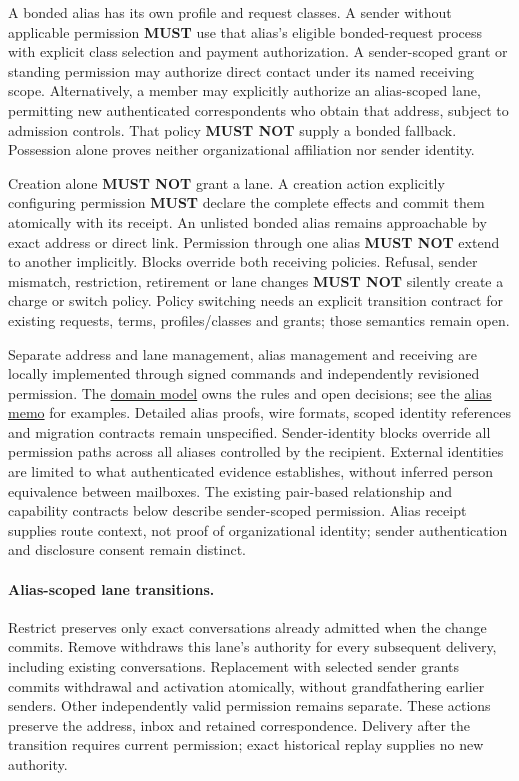 \documentclass[11pt]{article}
\newcommand{\MUST}{\textbf{MUST}}
\newcommand{\MUSTNOT}{\textbf{MUST NOT}}
\begin{document}
A bonded alias has its own profile and request classes. A sender without applicable
permission \MUST{} use that alias's eligible bonded-request process with explicit
class selection and payment authorization. A sender-scoped grant or standing
permission may authorize direct contact under its named receiving scope.
Alternatively, a member may explicitly authorize an alias-scoped lane, permitting
new authenticated correspondents who obtain that address, subject to admission
controls. That policy \MUSTNOT{} supply a bonded fallback. Possession alone proves
neither organizational affiliation nor sender identity.

Creation alone \MUSTNOT{} grant a lane. A creation action explicitly configuring
permission \MUST{} declare the complete effects and commit them atomically with
its receipt. An unlisted bonded alias remains approachable by exact address or
direct link. Permission through one alias \MUSTNOT{} extend to another implicitly.
Blocks override both receiving policies. Refusal, sender mismatch, restriction,
retirement or lane changes \MUSTNOT{} silently create a charge or switch policy.
Policy switching needs an explicit transition contract for existing requests,
terms, profiles/classes and grants; those semantics remain open.

Separate address and lane management, alias management and receiving are locally
implemented through signed commands and independently revisioned permission. The
\href{DOMAIN_MODEL.md}{domain model} owns the rules and open decisions; see the
\href{cs_mail_aliases_and_express_lanes.tex}{alias memo} for examples. Detailed
alias proofs, wire formats, scoped identity references and migration contracts
remain unspecified. Sender-identity blocks override all permission paths across
all aliases controlled by the recipient. External identities are limited to
what authenticated evidence establishes, without inferred person equivalence
between mailboxes. The existing
pair-based relationship and capability contracts below describe sender-scoped
permission. Alias receipt supplies route context, not proof of organizational
identity; sender authentication and disclosure consent remain distinct.

\paragraph{Alias-scoped lane transitions.}
Restrict preserves only exact conversations already admitted when the change
commits. Remove withdraws this lane's authority for every subsequent delivery,
including existing conversations. Replacement with selected sender grants commits
withdrawal and activation atomically, without grandfathering earlier senders.
Other independently valid permission remains separate. These actions preserve
the address, inbox and retained correspondence. Delivery after the transition
requires current permission; exact historical replay supplies no new authority.
\end{document}

